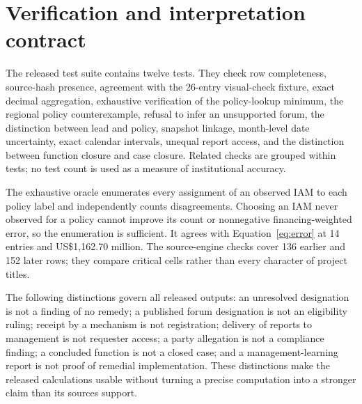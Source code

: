 \documentclass[11pt,a4paper]{article}
\newcommand{\USD}{US\$}
\begin{document}
\section{Verification and interpretation contract}
The released test suite contains twelve tests. They check row completeness, source-hash presence, agreement with the 26-entry visual-check fixture, exact decimal aggregation, exhaustive verification of the policy-lookup minimum, the regional policy counterexample, refusal to infer an unsupported forum, the distinction between lead and policy, snapshot linkage, month-level date uncertainty, exact calendar intervals, unequal report access, and the distinction between function closure and case closure. Related checks are grouped within tests; no test count is used as a measure of institutional accuracy.

The exhaustive oracle enumerates every assignment of an observed IAM to each policy label and independently counts disagreements. Choosing an IAM never observed for a policy cannot improve its count or nonnegative financing-weighted error, so the enumeration is sufficient. It agrees with Equation~\ref{eq:error} at 14 entries and \USD1,162.70 million. The source-engine checks cover 136 earlier and 152 later rows; they compare critical cells rather than every character of project titles.

The following distinctions govern all released outputs: an unresolved designation is not a finding of no remedy; a published forum designation is not an eligibility ruling; receipt by a mechanism is not registration; delivery of reports to management is not requester access; a party allegation is not a compliance finding; a concluded function is not a closed case; and a management-learning report is not proof of remedial implementation. These distinctions make the released calculations usable without turning a precise computation into a stronger claim than its sources support.
\end{document}
